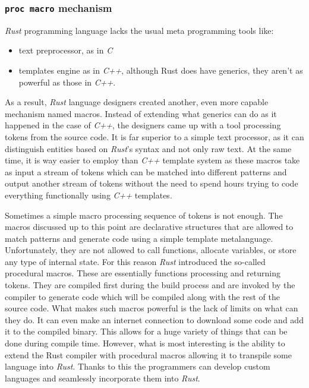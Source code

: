 \subsubsection{\texttt{proc macro} mechanism}
\textit{Rust} programming language lacks the usual meta programming tools like:
\begin{itemize}
    \item text preprocessor, as in \textit{C}
    \item templates engine as in \textit{C++}, although Rust does have generics, they aren't as powerful as those in \textit{C++}.
\end{itemize}
As a result, \textit{Rust} language designers created another, even more capable mechanism named macros. Instead of extending what generics can do as it happened in the case of \textit{C++}, the designers came up with a tool processing tokens from the source code. It is far superior to a simple text processor, as it can distinguish entities based on \textit{Rust}'s syntax and not only raw text. At the same time, it is way easier to employ than \textit{C++} template system as these macros take as input a stream of tokens which can be matched into different patterns and output another stream of tokens without the need to spend hours trying to code everything functionally using \textit{C++} templates. 

Sometimes a simple macro processing sequence of tokens is not enough. The macros discussed up to this point are declarative structures that are allowed to match patterns and generate code using a simple template metalanguage. Unfortunately, they are not allowed to call functions, allocate variables, or store any type of internal state. For this reason \textit{Rust} introduced the so-called procedural macros. These are essentially functions processing and returning tokens. They are compiled first during the build process and are invoked by the compiler to generate code which will be compiled along with the rest of the source code. What makes such macros powerful is the lack of limits on what can they do. It can even make an internet connection to download some code and add it to the compiled binary. This allows for a huge variety of things that can be done during compile time. However, what is most interesting is the ability to extend the Rust compiler with procedural macros allowing it to transpile some language into \textit{Rust}. Thanks to this the programmers can develop custom languages and seamlessly incorporate them into \textit{Rust}.

